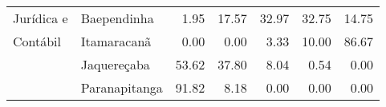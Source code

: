 \begin{table}[ht]
\begin{tabular}{ll rrrrr}
    Jurídica e         	  & Baependinha             &               1.95 &        17.57 &       32.97 &      32.75 &            14.75 \\ 
	Contábil			  & Itamaracanã             &               0.00 &         0.00 &        3.33 &      10.00 &            86.67 \\ 
						  & Jaquereçaba             &              53.62 &        37.80 &        8.04 &       0.54 &             0.00 \\ 
                          & Paranapitanga           &              91.82 &         8.18 &        0.00 &       0.00 &             0.00 \\ 
   \bottomrule
\end{tabular}
\label{tabela:q15p}
\end{table}

